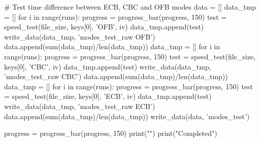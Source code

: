 \begin{python}
    # Test time difference between ECB, CBC and OFB modes
    data = []
    data_tmp = []
    for i in range(runs):
        progress = progress_bar(progress, 150)
        test = speed_test(file_size, keys[0], 'OFB', iv)
        data_tmp.append(test)
    write_data(data_tmp, 'modes_test_raw OFB')
    data.append(sum(data_tmp)/len(data_tmp))
    data_tmp = []
    for i in range(runs):
        progress = progress_bar(progress, 150)
        test = speed_test(file_size, keys[0], 'CBC', iv)
        data_tmp.append(test)
    write_data(data_tmp, 'modes_test_raw CBC')
    data.append(sum(data_tmp)/len(data_tmp))
    data_tmp = []
    for i in range(runs):
        progress = progress_bar(progress, 150)
        test = speed_test(file_size, keys[0], 'ECB', iv)
        data_tmp.append(test)
    write_data(data_tmp, 'modes_test_raw ECB')
    data.append(sum(data_tmp)/len(data_tmp))
    write_data(data, 'modes_test')

    progress = progress_bar(progress, 150)
    print("\n")
    print("Completed")

\end{python}
